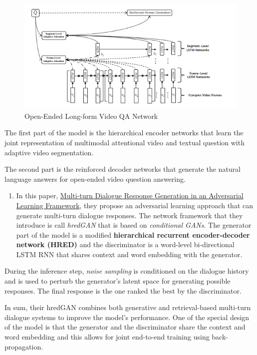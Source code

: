 \documentclass{acm_proc_article-sp}
\providecommand{\tightlist}{%
  \setlength{\itemsep}{0pt}\setlength{\parskip}{0pt}}
\begin{document}
\begin{figure}
\centering
\includegraphics{img/oe.png}
\caption{Open-Ended Long-form Video QA Network}
\end{figure}

The first part of the model is the hierarchical encoder networks that
learn the joint representation of multimodal attentional video and
textual question with adaptive video segmentation.

The second part is the reinforced decoder networks that generate the
natural language answers for open-ended video question answering.

\begin{enumerate}
\def\labelenumi{\arabic{enumi}.}
\setcounter{enumi}{2}
\tightlist
\item
  In this paper, \href{https://arxiv.org/pdf/1805.11752.pdf}{Multi-turn
  Dialogue Response Generation in an Adversarial Learning Framework},
  they propose an adversarial learning approach that can generate
  multi-turn dialogue responses. The network framework that they
  introduce is call \emph{hredGAN} that is based on \emph{conditional
  GANs}. The generator part of the model is a modified
  \textbf{hierarchical recurrent encoder-decoder network (HRED)} and the
  discriminator is a word-level bi-directional LSTM RNN that shares
  context and word embedding with the generator.
\end{enumerate}

During the inference step, \emph{noise sampling} is conditioned on the
dialogue history and is used to perturb the generator's latent space for
generating possible responses. The final response is the one ranked the
best by the discriminator.

In sum, their hredGAN combines both generative and retrieval-based
multi-turn dialogue systems to improve the model's performance. One of
the special design of the model is that the generator and the
discriminator share the context and word embedding and this allows for
joint end-to-end training using back-propagation.
\end{document}
